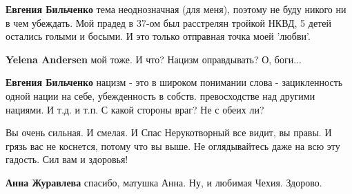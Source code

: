 \begin{itemize}
\begin{itemize}
\textbf{Евгения Бильченко} тема неоднозначная (для меня), поэтому не буду никого ни в чем убеждать. Мой прадед в 37-ом был расстрелян тройкой НКВД, 5 детей остались голыми и босыми. И это только отправная точка моей 'любви'.

 
\textbf{Yelena Andersen} мой тоже. И что? Нацизм оправдывать? О, боги...

 
\textbf{Евгения Бильченко} нацизм - это в широком понимании слова - зацикленность одной нации на себе, убежденность в собств. превосходстве над другими нациями. И т.д. и т.п. С какой стороны враг? Не с обеих ли?

\end{itemize}

 

Вы очень сильная. И смелая. И Спас Нерукотворный все видит, вы правы. И грязь
вас не коснется, потому что вы выше. Не оглядывайтесь даже на всю эту гадость.
Сил вам и здоровья!

\begin{itemize}
 
\textbf{Анна Журавлева} спасибо, матушка Анна. Ну, и любимая Чехия. Здорово.

 

\end{itemize}
\end{itemize}
